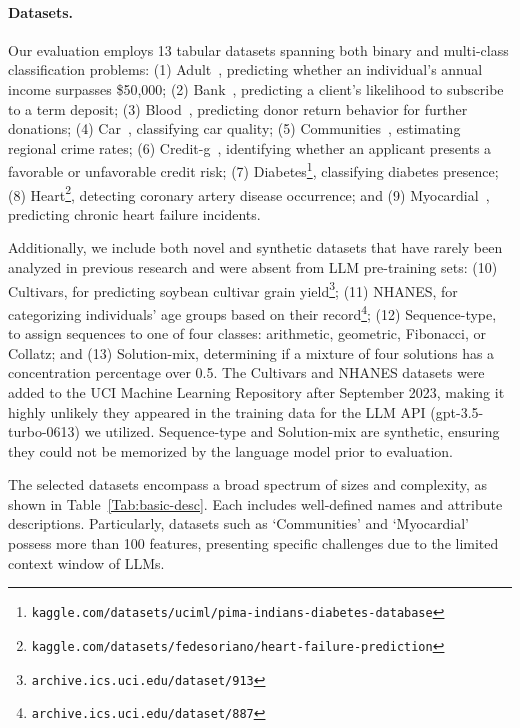\paragraph{Datasets.}
Our evaluation employs 13 tabular datasets spanning both binary and multi-class classification problems: (1) Adult~\cite{asuncion2007uci}, predicting whether an individual's annual income surpasses \$50,000; (2) Bank~\cite{moro2014data}, predicting a client's likelihood to subscribe to a term deposit; (3) Blood~\cite{yeh2009knowledge}, predicting donor return behavior for further donations; (4) Car~\cite{kadra2021well}, classifying car quality; (5) Communities~\cite{misc_communities_and_crime_183}, estimating regional crime rates; (6) Credit-g~\cite{kadra2021well}, identifying whether an applicant presents a favorable or unfavorable credit risk; (7) Diabetes\footnote{\texttt{kaggle.com/datasets/uciml/pima-indians-diabetes-database}}, classifying diabetes presence; (8) Heart\footnote{\texttt{kaggle.com/datasets/fedesoriano/heart-failure-prediction}}, detecting coronary artery disease occurrence; and (9) Myocardial~\cite{misc_myocardial_infarction_complications_579}, predicting chronic heart failure incidents.

Additionally, we include both novel and synthetic datasets that have rarely been analyzed in previous research and were absent from LLM pre-training sets: (10) Cultivars, for predicting soybean cultivar grain yield\footnote{\texttt{archive.ics.uci.edu/dataset/913}}; (11) NHANES, for categorizing individuals' age groups based on their record\footnote{\texttt{archive.ics.uci.edu/dataset/887}}; (12) Sequence-type, to assign sequences to one of four classes: arithmetic, geometric, Fibonacci, or Collatz; and (13) Solution-mix, determining if a mixture of four solutions has a concentration percentage over 0.5. The Cultivars and NHANES datasets were added to the UCI Machine Learning Repository after September 2023, making it highly unlikely they appeared in the training data for the LLM API (gpt-3.5-turbo-0613) we utilized. Sequence-type and Solution-mix are synthetic, ensuring they could not be memorized by the language model prior to evaluation.

The selected datasets encompass a broad spectrum of sizes and complexity, as shown in Table~\ref{Tab:basic-desc}. Each includes well-defined names and attribute descriptions. Particularly, datasets such as `Communities' and `Myocardial' possess more than 100 features, presenting specific challenges due to the limited context window of LLMs.

